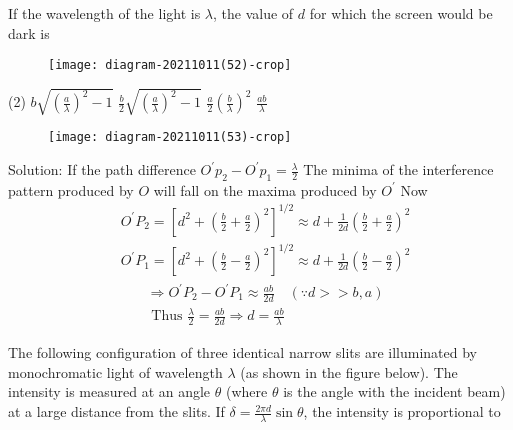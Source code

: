 \begin{enumerate}
\begin{minipage}{\textwidth}
	If the wavelength of the light is $\lambda$, the value of $d$ for which the screen would be dark is
	\begin{figure}[H]
		\centering
		\texttt{[image: diagram-20211011(52)-crop]}
	\end{figure}
\end{minipage}
\begin{tasks}(2)
	\task[\textbf{A.}] $b \sqrt{\left(\frac{a}{\lambda}\right)^{2}-1}$
	\task[\textbf{B.}]$\frac{b}{2} \sqrt{\left(\frac{a}{\lambda}\right)^{2}-1}$
	\task[\textbf{C.}]$\frac{a}{2}\left(\frac{b}{\lambda}\right)^{2}$
	\task[\textbf{D.}]$\frac{a b}{\lambda}$
\end{tasks}
\begin{answer}
	\begin{figure}[H]
		\centering
		\texttt{[image: diagram-20211011(53)-crop]}
	\end{figure}
	Solution: If the path difference $O^{\prime} p_{2}-O^{\prime} p_{1}=\frac{\lambda}{2}$
	The minima of the interference pattern produced by $O$ will fall on the maxima produced by $O^{\prime}$ Now
	$$
	\begin{aligned}
	&O^{\prime} P_{2}=\left[d^{2}+\left(\frac{b}{2}+\frac{a}{2}\right)^{2}\right]^{1 / 2} \approx d+\frac{1}{2 d}\left(\frac{b}{2}+\frac{a}{2}\right)^{2} \\
	&O^{\prime} P_{1}=\left[d^{2}+\left(\frac{b}{2}-\frac{a}{2}\right)^{2}\right]^{1 / 2} \approx d+\frac{1}{2 d}\left(\frac{b}{2}-\frac{a}{2}\right)^{2}
	\end{aligned}
	$$
	$$\begin{aligned}
	&\Rightarrow O^{\prime} P_{2}-O^{\prime} P_{1} \approx \frac{a b}{2 d} \quad(\because d>>b, a) \\
	&\text { Thus } \frac{\lambda}{2}=\frac{a b}{2 d} \Rightarrow d=\frac{a b}{\lambda}
	\end{aligned}$$
\end{answer}
\begin{minipage}{\textwidth}
	\item The following configuration of three identical narrow slits are illuminated by monochromatic light of wavelength $\lambda$ (as shown in the figure below). The intensity is measured at an angle $\theta$ (where $\theta$ is the angle with the incident beam) at a large distance from the slits. If $\delta=\frac{2 \pi d}{\lambda} \sin \theta$, the intensity is proportional to
	\begin{figure}[H]

\end{figure}
\end{minipage}
\end{enumerate}
